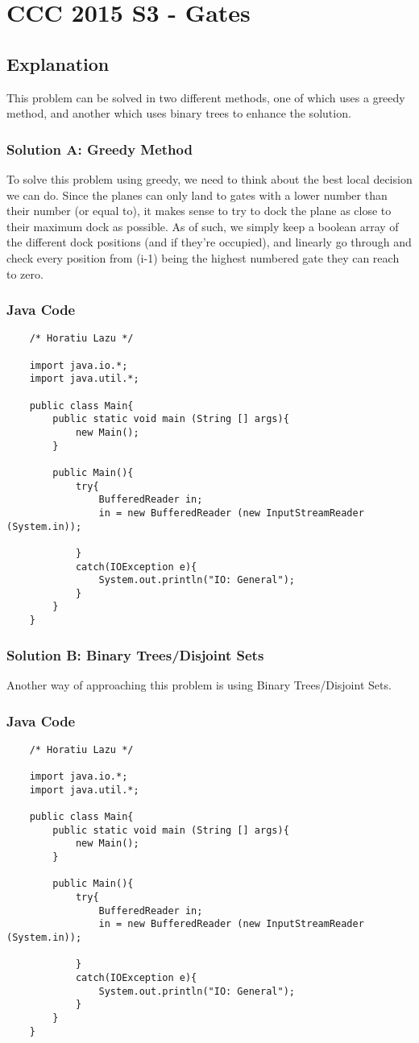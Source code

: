 \documentclass[52pt]{article}
\begin{document}
	\section {CCC 2015 S3 - Gates}
	\subsection {Explanation}
	This problem can be solved in two different methods, one of which uses a greedy method, and another which uses binary trees to enhance the solution.
	\subsubsection{Solution A: Greedy Method}
	To solve this problem using greedy, we need to think about the best local decision we can do. Since the planes can only land to gates with a lower number than their number (or equal to), it makes sense to try to dock the plane as close to their maximum dock as possible. As of such, we simply keep a boolean array of the different dock positions (and if they're occupied), and linearly go through and check every position from (i-1) being the highest numbered gate they can reach to zero. 
	
	\subsubsection {Java Code}
	\begin{lstlisting}
	/* Horatiu Lazu */

	import java.io.*;
	import java.util.*;

	public class Main{
		public static void main (String [] args){
			new Main();
		}
		
		public Main(){
			try{
				BufferedReader in;
				in = new BufferedReader (new InputStreamReader (System.in));
				
			}
			catch(IOException e){
				System.out.println("IO: General");
			}
		}
	}
	\end{lstlisting}
	
	\subsubsection{Solution B: Binary Trees/Disjoint Sets}
	Another way of approaching this problem is using Binary Trees/Disjoint Sets.
	
	\subsubsection {Java Code}
	\begin{lstlisting}
	/* Horatiu Lazu */

	import java.io.*;
	import java.util.*;

	public class Main{
		public static void main (String [] args){
			new Main();
		}
		
		public Main(){
			try{
				BufferedReader in;
				in = new BufferedReader (new InputStreamReader (System.in));
				
			}
			catch(IOException e){
				System.out.println("IO: General");
			}
		}
	}
	\end{lstlisting}

	\newpage
\end{document}
